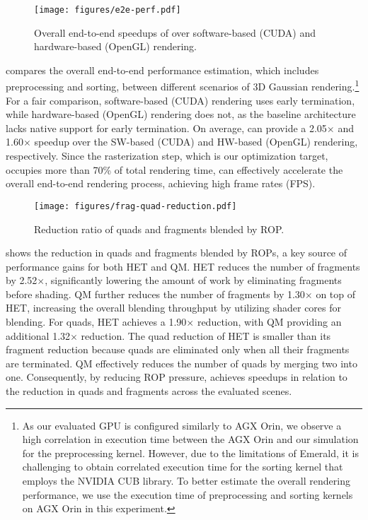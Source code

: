 \begin{figure}[t]
  \centering
  \texttt{[image: figures/e2e-perf.pdf]}
  \caption{Overall end-to-end speedups of \name{} over software-based (CUDA) and
  hardware-based (OpenGL) rendering.}
  \label{fig:eval-perf}
\end{figure}

%
 compares the overall end-to-end performance estimation,
which includes preprocessing and sorting, between different scenarios of 3D
Gaussian rendering.\footnote{As our evaluated GPU is configured similarly to
AGX Orin, we observe a high correlation in execution time between the AGX Orin
and our simulation for the preprocessing kernel. However, due to the limitations
of Emerald, it is challenging to obtain correlated execution time for the
sorting kernel that employs the NVIDIA CUB library.
%
To better estimate the overall rendering performance, we use the execution time
of preprocessing and sorting kernels on AGX Orin in this experiment.}
%
For a fair comparison, software-based (CUDA) rendering uses early termination,
while hardware-based (OpenGL) rendering does not, as the baseline architecture
lacks native support for early termination.
%
On average, \name{} can provide a 2.05$\times$ and 1.60$\times$ speedup
over the SW-based (CUDA) and HW-based (OpenGL) rendering, respectively. 
%
Since the rasterization step, which is our optimization target, occupies more
than 70\% of total rendering time, \name{} can effectively accelerate the
overall end-to-end rendering process, achieving high frame rates (FPS).



\begin{figure}[t]
  \centering
  \texttt{[image: figures/frag-quad-reduction.pdf]}
  \caption{Reduction ratio of quads and fragments blended by ROP.}
  \vspace{-0.13in}
  \label{fig:frag-reduction}
\end{figure}



 shows the reduction in quads and fragments blended by
ROPs, a key source of performance gains for both HET and QM.
%
HET reduces the number of fragments by 2.52$\times$, significantly lowering the
amount of work by eliminating fragments before shading. QM further reduces the
number of fragments by 1.30$\times$ on top of HET, increasing the overall
blending throughput by utilizing shader cores for blending.
%
For quads, HET achieves a 1.90$\times$ reduction, with QM providing an
additional 1.32$\times$ reduction. The quad reduction of HET is smaller than
its fragment reduction because quads are eliminated only when all their
fragments are terminated. 
%
QM effectively reduces the number of quads by merging two into one. 
%
Consequently, by reducing ROP pressure, \name{} achieves speedups in relation
to the reduction in quads and fragments across the evaluated scenes.


